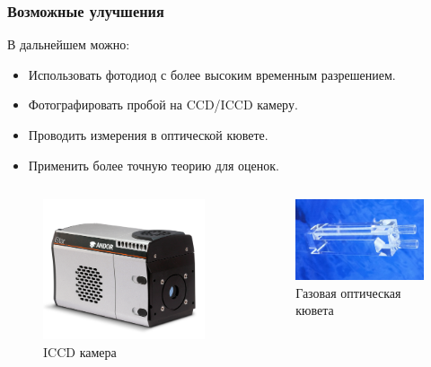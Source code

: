 \documentclass{beamer}
\begin{document}
	\begin{frame}
		\frametitle{Возможные улучшения}
		В дальнейшем можно:
		\begin{itemize}
			\item Использовать фотодиод с более высоким временным разрешением.
			\item Фотографировать пробой на CCD/ICCD камеру.
			\item Проводить измерения в оптической кювете.
			\item Применить более точную теорию для оценок.
		\end{itemize}
		
		\begin{columns}
			\begin{figure}
				\centering
				\includegraphics[width=0.9\linewidth]{res/iccd_camera.png}
				\caption*{ICCD камера}
			\end{figure}
			\begin{figure}
				\centering
				\includegraphics[width=0.9\linewidth]{res/gas_cuvette.jpeg}
				\caption*{Газовая оптическая кювета}
			\end{figure}
		\end{columns}
		
		
	\end{frame}
	
\end{document}
